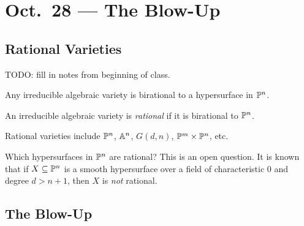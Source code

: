 \chapter{Oct.~28 --- The Blow-Up}

\section{Rational Varieties}

TODO: fill in notes from beginning of class.

\begin{theorem}
  Any irreducible algebraic variety
  is birational to a hypersurface in
  $\mathbb{P}^n$.
\end{theorem}

\begin{definition}
  An irreducible algebraic variety is
  \emph{rational} if it is birational to
  $\mathbb{P}^n$.
\end{definition}

\begin{example}
  Rational varieties include
  $\mathbb{P}^n$, $\mathbb{A}^n$, $G(d, n)$,
  $\mathbb{P}^m \times \mathbb{P}^n$, etc.
\end{example}

\begin{remark}
  Which hypersurfaces in $\mathbb{P}^n$ are
  rational? This is an open question. It
  is known that if $X \subseteq \mathbb{P}^n$
  is a smooth hypersurface over a
  field of characteristic $0$ and
  degree $d > n + 1$, then $X$ is \emph{not}
  rational.
\end{remark}

\section{The Blow-Up}

